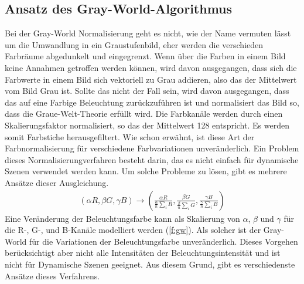   \subsection{Ansatz des Gray-World-Algorithmus}\label{s.gw}
Bei der Gray-World Normalisierung \cite{buenaposada2001variations} geht es nicht, wie der Name vermuten lässt um die Umwandlung in ein Graustufenbild, eher werden die verschieden Farbräume abgedunkelt und eingegrenzt. Wenn über die Farben in einem Bild keine Annahmen getroffen werden können, wird davon ausgegangen, dass sich die Farbwerte in einem Bild sich vektoriell zu Grau addieren, also das der Mittelwert vom Bild Grau ist. Sollte das nicht der Fall sein, wird davon ausgegangen, dass das auf eine Farbige Beleuchtung zurückzuführen ist und normalisiert das Bild so, dass die Graue-Welt-Theorie erfüllt wird. Die Farbkanäle werden durch einen Skalierungsfaktor normalisiert, so das der Mittelwert 128 entspricht. Es werden somit Farbstiche herausgefiltert. Wie schon erwähnt, ist diese Art der Farbnormalisierung für verschiedene Farbvariationen unveränderlich. Ein Problem dieses Normalisierungverfahren besteht darin, das es nicht einfach für dynamische Szenen verwendet werden kann. Um solche Probleme zu lösen, gibt es mehrere Ansätze dieser Ausgleichung.
\begin{align} \label{f:gw} (\alpha R, \beta G, \gamma B) \rightarrow\left(\frac{\alpha R} {\frac{\alpha}{n} \sum_{i} R}, \frac{\beta G} {\frac{\beta}{n} \sum_{i} G}, \frac{\gamma B} {\frac{\gamma}{n} \sum_{i} B} \right) \end{align}
Eine Veränderung der Beleuchtungsfarbe kann als Skalierung von $\alpha$, $\beta$ und $\gamma$ für die R-, G-, und B-Kanäle modelliert werden (\ref{f:gw}). Als solcher ist der Gray-World für die Variationen der Beleuchtungsfarbe unveränderlich. Dieses Vorgehen berücksichtigt aber nicht alle Intensitäten der Beleuchtungsintensität und ist nicht für Dynamische Szenen geeignet. Aus diesem Grund, gibt es verschiedenste Ansätze dieses Verfahrens.
